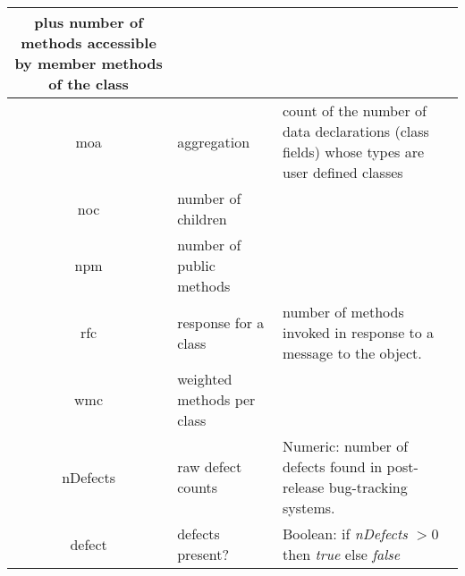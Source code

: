 \begin{figure*}[t!]
\begin{center}
{\begin{tabular}{c|l|p{4.7in}}
				plus number of methods accessible by member methods of the
				class\\\hline
				moa &  aggregation &  count of the number of data declarations (class
				fields) whose types are user defined classes\\\hline
				noc &  number of children &\\\hline
				npm & number of public methods & \\\hline
				rfc & response for a class &number of  methods invoked in response to
				a message to the object.\\\hline
				wmc & weighted methods per class &\\\hline
				\rowcolor{lightgray}
				nDefects & raw defect counts & Numeric: number of defects found in post-release bug-tracking systems.\\
				\rowcolor{lightgray}
				defect & defects present? & Boolean: if {\em nDefects} $>0$ then {\em true} else {\em false}
			\end{tabular}
		}
	\end{center}
	\caption{OO measures used in our defect data sets.  Last lines, shown in \textcolor{gray} denote the dependent variables.}\label{fig:ck}
\end{figure*}